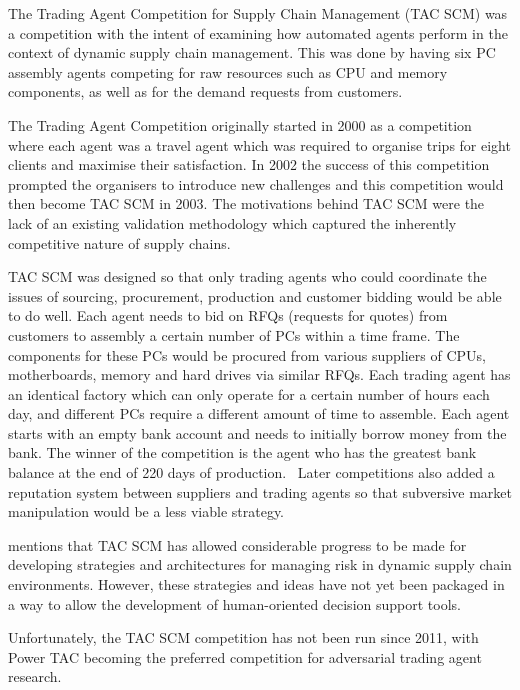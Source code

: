 The Trading Agent Competition for Supply Chain Management (TAC SCM) was a competition with the intent of examining how automated agents perform in the context of dynamic supply chain management.
This was done by having six PC assembly agents competing for raw resources such as CPU and memory components, as well as for the demand requests from customers.~\cite{sadeh2003tac}

The Trading Agent Competition originally started in 2000 as a competition where each agent was a travel agent which was required to organise trips for eight clients and maximise their satisfaction.
In 2002 the success of this competition prompted the organisers to introduce new challenges and this competition would then become TAC SCM in 2003.
The motivations behind TAC SCM were the lack of an existing validation methodology which captured the inherently competitive nature of supply chains.~\cite{arunachalam2005supply}

TAC SCM was designed so that only trading agents who could coordinate the issues of sourcing, procurement, production and customer bidding would be able to do well.
Each agent needs to bid on RFQs (requests for quotes) from customers to assembly a certain number of PCs within a time frame.
The components for these PCs would be procured from various suppliers of CPUs, motherboards, memory and hard drives via similar RFQs.
Each trading agent has an identical factory which can only operate for a certain number of hours each day, and different PCs require a different amount of time to assemble.
Each agent starts with an empty bank account and needs to initially borrow money from the bank.
The winner of the competition is the agent who has the greatest bank balance at the end of 220 days of production.~\cite{arunachalam2005supply}
Later competitions also added a reputation system between suppliers and trading agents so that subversive market manipulation would be a less viable strategy.~\cite{collins2010pushing}

 mentions that TAC SCM has allowed considerable pro\-gress to be made for developing strategies and architectures for managing risk in dynamic supply chain environments.
However, these strategies and ideas have not yet been packaged in a way to allow the development of human-oriented decision support tools.

Unfortunately, the TAC SCM competition has not been run since 2011, with Power TAC becoming the preferred competition for adversarial trading agent research.

